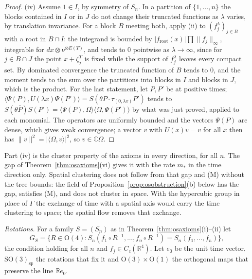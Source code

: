 \documentclass[aps,prd,twocolumn,superscriptaddress,nofootinbib,longbibliography,floatfix,amsmath,amssymb,10pt]{revtex4-2}
\theoremstyle{definition}
\theoremstyle{remark}
\newcommand{\R}{\mathbb{R}}
\newcommand{\C}{\mathbb{C}}
\newcommand{\SO}{\mathrm{SO}}
\newcommand{\ip}[2]{\langle #1,#2\rangle}
\begin{document}
\begin{proof}
(iv) Assume $1\in I$, by symmetry of $S_n$. In a partition of
$\{1,\dots,n\}$ the blocks contained in $I$ or in $J$ do not change their
truncated functions as $\lambda$ varies, by translation invariance. For a
block $B$ meeting both, apply (ii) to $(f^\lambda_j)_{j\in B}$ with a root
in $B\cap I$: the integrand is bounded by $|f_{\mathrm{root}}(x)|\prod
\|f_j\|_\infty$, integrable for $dx\otimes\nu^{\otimes E(T)}$, and tends to
$0$ pointwise as $\lambda\to\infty$, since for $j\in B\cap J$ the point
$x+\zeta^T_j$ is fixed while the support of $f^\lambda_j$ leaves every
compact set. By dominated convergence the truncated function of $B$ tends
to $0$, and the moment tends to the sum over the partitions into blocks in
$I$ and blocks in $J$, which is the product. For the last statement, let
$P,P'$ be at positive times; $\ip{\Psi(P)}{U(\lambda x)\Psi(P')}=S(\theta
\bar P\cdot\tau_{(0,\lambda x)}P')$ tends to $S(\theta\bar P)S(P')=
\ip{\Psi(P)}\Omega\ip\Omega{\Psi(P')}$ by what was just proved, applied to
each monomial. The operators are uniformly bounded and the vectors $\Psi(P)$
are dense, which gives weak convergence; a vector $v$ with $U(x)v=v$ for all
$x$ then has $\|v\|^2=|\ip\Omega v|^2$, so $v\in\C\Omega$.
\end{proof}

Part (iv) is the cluster property of the axioms in every direction, for all
$n$. The gap of Theorem~\ref{thm:osaxioms}(vi) gives it with the rate $m_*$
in the time direction only. Spatial clustering does not follow from that
gap and (M) without the tree bounds: the field of
Proposition~\ref{prop:osobstruction}(b) below has the gap, satisfies (M),
and does not cluster in space. With the hypercubic group in place of
$\Gamma$ the exchange of time with a spatial axis would carry the time
clustering to space; the spatial flow removes that exchange.

\emph{Rotations.} For a family $S=(S_n)$ as in
Theorem~\ref{thm:osaxioms}(i)--(ii) let
\[
G_S=\bigl\{R\in\mathrm O(4):S_n(f_1\circ R^{-1},\dots,f_n\circ R^{-1})
=S_n(f_1,\dots,f_n)\bigr\},
\]
the condition holding for all $n$ and $f_j\in C_c(\R^4)$. Let $e_0$ be the
unit time vector, $\SO(3)_{\mathrm{sp}}$ the rotations that fix it and
$\mathrm O(3)\times\mathrm O(1)$ the orthogonal maps that preserve the line
$\R e_0$.
\end{document}
